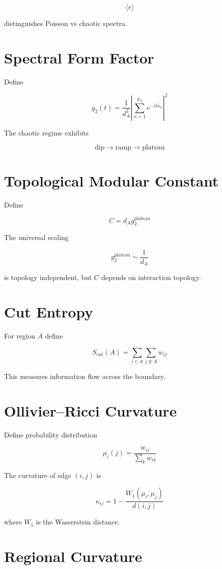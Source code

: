 \documentclass[11pt,a4paper]{article}
\begin{document}
\[
\langle r \rangle
\]

distinguishes Poisson vs chaotic spectra.

\section{Spectral Form Factor}

Define

\[
g_2(t)
=
\frac{1}{d_A^2}
\left|
\sum_{n=1}^{d_A}
e^{-it\tilde{\kappa}_n}
\right|^2
\]

The chaotic regime exhibits

\[
\text{dip} \rightarrow \text{ramp} \rightarrow \text{plateau}
\]

\section{Topological Modular Constant}

Define

\[
C = d_A g_2^{\mathrm{plateau}}
\]

The universal scaling

\[
g_2^{\mathrm{plateau}} \sim \frac{1}{d_A}
\]

is topology independent, but $C$ depends on interaction topology.

\section{Cut Entropy}

For region $A$ define

\[
S_{cut}(A)
=
\sum_{i\in A}\sum_{j\notin A}w_{ij}
\]

This measures information flow across the boundary.

\section{Ollivier–Ricci Curvature}

Define probability distribution

\[
\mu_i(j)=\frac{w_{ij}}{\sum_k w_{ik}}
\]

The curvature of edge $(i,j)$ is

\[
\kappa_{ij}
=
1
-
\frac{W_1(\mu_i,\mu_j)}{d(i,j)}
\]

where $W_1$ is the Wasserstein distance.

\section{Regional Curvature}
\end{document}
